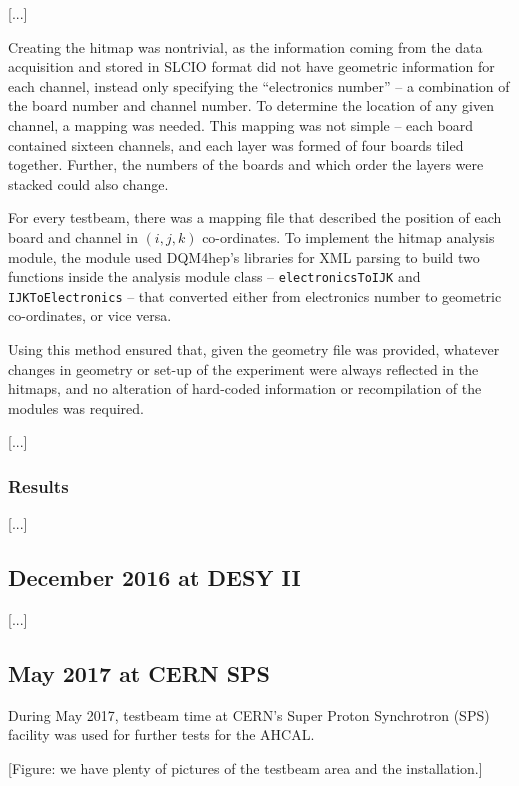 [...]

Creating the hitmap was nontrivial, as the information coming from the data acquisition and stored in SLCIO format did not have geometric information for each channel, instead only specifying the ``electronics number'' -- a combination of the board number and channel number. To determine the location of any given channel, a mapping was needed. This mapping was not simple -- each board contained sixteen channels, and each layer was formed of four boards tiled together. Further, the numbers of the boards and which order the layers were stacked could also change.

For every testbeam, there was a mapping file that described the position of each board and channel in $(i, j, k)$ co-ordinates. To implement the hitmap analysis module, the module used DQM4hep's libraries for XML parsing to build two functions inside the analysis module class --  \texttt{electronicsToIJK} and \texttt{IJKToElectronics} -- that converted either from electronics number to geometric co-ordinates, or vice versa.

Using this method ensured that, given the geometry file was provided, whatever changes in geometry or set-up of the experiment were always reflected in the hitmaps, and no alteration of hard-coded information or recompilation of the modules was required.

[...]

\subsubsection{Results}

[...]

\subsection{December 2016 at DESY II}
[...]

\subsection{May 2017 at CERN SPS}

During May 2017, testbeam time at CERN's Super Proton Synchrotron (SPS) facility was used for further tests for the AHCAL.

\begin{center}
	[Figure: we have plenty of pictures of the testbeam area and the installation.]
\end{center}

